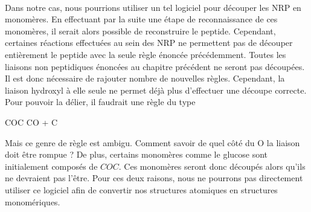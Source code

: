 \documentclass[12pt,french,twoside]{report}
\begin{document}
\paragraph{}Dans notre cas, nous pourrions utiliser un tel logiciel pour découper les NRP en monomères.
En effectuant par la suite une étape de reconnaissance de ces monomères, il serait alors possible de reconstruire le peptide.
Cependant, certaines réactions effectuées au sein des NRP ne permettent pas de découper entièrement le peptide avec la seule règle énoncée précédemment.
Toutes les liaisons non peptidiques énoncées au chapitre précédent ne seront pas découpées.
Il est donc nécessaire de rajouter nombre de nouvelles règles.
Cependant, la liaison hydroxyl à elle seule ne permet déjà plus d'effectuer une découpe correcte.
Pour pouvoir la délier, il faudrait une règle du type
\begin{chemmath}
  COC \longrightarrow CO + C
\end{chemmath}
Mais ce genre de règle est ambigu.
Comment savoir de quel côté du O la liaison doit être rompue ?
De plus, certains monomères comme le glucose sont initialement composés de $COC$.
Ces monomères seront donc découpés alors qu'ils ne devraient pas l'être.
Pour ces deux raisons, nous ne pourrons pas directement utiliser ce logiciel afin de convertir nos structures atomiques en structures monomériques.
% 
% 
% 
\end{document}
